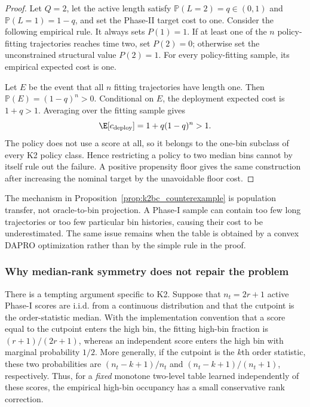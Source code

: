 \begin{proof}
Let $Q=2$, let the active length satisfy
$\mathbb P(L=2)=q\in(0,1)$ and $\mathbb P(L=1)=1-q$, and set the Phase-II
target cost to one.  Consider the following empirical rule.  It always sets
$P(1)=1$.  If at least one of the $n$ policy-fitting trajectories reaches time
two, set $P(2)=0$; otherwise set the unconstrained structural value $P(2)=1$.
For every policy-fitting sample, its empirical expected cost is one.

Let $E$ be the event that all $n$ fitting trajectories have length one.
Then $\mathbb P(E)=(1-q)^n>0$.  Conditional on $E$, the deployment expected
cost is $1+q>1$.  Averaging over the fitting sample gives
\begin{equation}
    \E[c_{\mathrm{deploy}}]
    =1+q(1-q)^n>1.
\end{equation}
The policy does not use a score at all, so it belongs to the one-bin subclass
of every K2 policy class.  Hence restricting a policy to two median bins cannot
by itself rule out the failure.  A positive propensity floor gives the same
construction after increasing the nominal target by the unavoidable floor
cost.
\end{proof}

The mechanism in Proposition~\ref{prop:k2bc_counterexample} is population
transfer, not oracle-to-bin projection.  A Phase-I sample can contain too few
long trajectories or too few particular bin histories, causing their cost to
be underestimated.  The same issue remains when the table is obtained by a
convex DAPRO optimization rather than by the simple rule in the proof.

\subsubsection{Why median-rank symmetry does not repair the problem}

There is a tempting argument specific to K2.  Suppose that $n_t=2r+1$
active Phase-I scores are i.i.d. from a continuous distribution and that the
cutpoint is the order-statistic median.  With the implementation convention
that a score equal to the cutpoint enters the high bin, the fitting high-bin
fraction is $(r+1)/(2r+1)$, whereas an independent score enters the high bin
with marginal probability $1/2$.  More generally, if the cutpoint is the
$k$th order statistic, these two probabilities are
$(n_t-k+1)/n_t$ and $(n_t-k+1)/(n_t+1)$, respectively.  Thus, for a
\emph{fixed} monotone two-level table learned independently of these scores,
the empirical high-bin occupancy has a small conservative rank correction.

